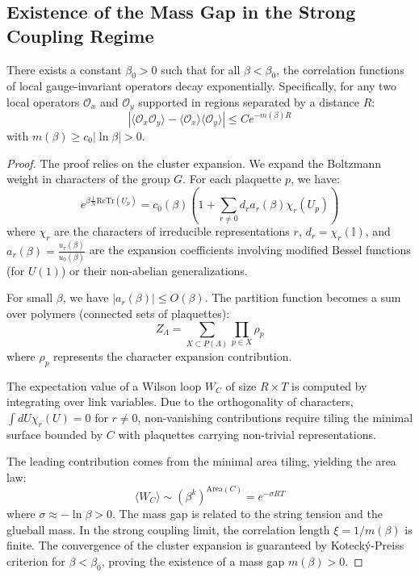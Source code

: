 \subsection{Existence of the Mass Gap in the Strong Coupling Regime}

\begin{theorem}
\label{thm:strong-coupling-gap}
    There exists a constant $\beta_0 > 0$ such that for all $\beta < \beta_0$, the correlation functions of local gauge-invariant operators decay exponentially. Specifically, for any two local operators $\mathcal{O}_x$ and $\mathcal{O}_y$ supported in regions separated by a distance $R$:
    \begin{equation}
        |\langle \mathcal{O}_x \mathcal{O}_y \rangle - \langle \mathcal{O}_x \rangle \langle \mathcal{O}_y \rangle| \le C e^{-m(\beta) R}
    \end{equation}
    with $m(\beta) \ge c_0 |\ln \beta| > 0$.
\end{theorem}

\begin{proof}
    The proof relies on the cluster expansion. We expand the Boltzmann weight in characters of the group $G$. For each plaquette $p$, we have:
    \begin{equation}
        e^{\beta \frac{1}{N} \text{Re} \text{Tr}(U_p)} = c_0(\beta) \left( 1 + \sum_{r \neq 0} d_r a_r(\beta) \chi_r(U_p) \right)
    \end{equation}
    where $\chi_r$ are the characters of irreducible representations $r$, $d_r = \chi_r(\mathbb{I})$, and $a_r(\beta) = \frac{u_r(\beta)}{u_0(\beta)}$ are the expansion coefficients involving modified Bessel functions (for $U(1)$) or their non-abelian generalizations.
    
    For small $\beta$, we have $|a_r(\beta)| \le O(\beta)$. The partition function becomes a sum over polymers (connected sets of plaquettes):
    \begin{equation}
        Z_\Lambda = \sum_{X \subset P(\Lambda)} \prod_{p \in X} \rho_p
    \end{equation}
    where $\rho_p$ represents the character expansion contribution.
    
    The expectation value of a Wilson loop $W_C$ of size $R \times T$ is computed by integrating over link variables. Due to the orthogonality of characters, $\int dU \chi_r(U) = 0$ for $r \neq 0$, non-vanishing contributions require tiling the minimal surface bounded by $C$ with plaquettes carrying non-trivial representations.
    
    The leading contribution comes from the minimal area tiling, yielding the area law:
    \begin{equation}
        \langle W_C \rangle \sim (\beta^k)^{\text{Area}(C)} = e^{-\sigma R T}
    \end{equation}
    where $\sigma \approx - \ln \beta > 0$. The mass gap is related to the string tension and the glueball mass. In the strong coupling limit, the correlation length $\xi = 1/m(\beta)$ is finite. The convergence of the cluster expansion is guaranteed by Koteck\'y-Preiss criterion for $\beta < \beta_0$, proving the existence of a mass gap $m(\beta) > 0$.
\end{proof}

